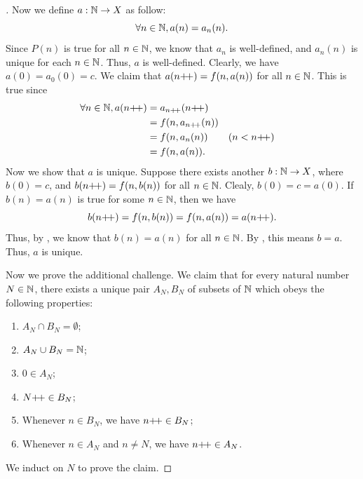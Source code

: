 \begin{proof}[]
  Now we define \(a : \mathbb{N} \to X\) as follow:
  \[
    \forall n \in \mathbb{N}, a(n) = a_n(n).
  \]
  Since \(P(n)\) is true for all \(n \in \mathbb{N}\), we know that \(a_n\) is well-defined, and \(a_n(n)\) is unique for each \(n \in \mathbb{N}\).
  Thus, \(a\) is well-defined.
  Clearly, we have \(a(0) = a_0(0) = c\).
  We claim that \(a(n{+}\!{+}) = f(n, a(n))\) for all \(n \in \mathbb{N}\).
  This is true since
  \begin{align*}
    \forall n \in \mathbb{N}, a(n{+}\!{+}) & = a_{n{+}\!{+}}(n{+}\!{+})                    \\
                              & = f(n, a_{n{+}\!{+}}(n))                 \\
                              & = f(n, a_n(n))      &  & (n < n{+}\!{+}) \\
                              & = f(n, a(n)).
  \end{align*}
  Now we show that \(a\) is unique.
  Suppose there exists another \(b : \mathbb{N} \to X\), where \(b(0) = c\), and \(b(n{+}\!{+}) = f(n, b(n))\) for all \(n \in \mathbb{N}\).
  Clealy, \(b(0) = c = a(0)\).
  If \(b(n) = a(n)\) is true for some \(n \in \mathbb{N}\), then we have
  \[
    b(n{+}\!{+}) = f(n, b(n)) = f(n, a(n)) = a(n{+}\!{+}).
  \]
  Thus, by , we know that \(b(n) = a(n)\) for all \(n \in \mathbb{N}\).
  By , this means \(b = a\).
  Thus, \(a\) is unique.

  Now we prove the additional challenge.
  We claim that for every natural number \(N \in \mathbb{N}\), there exists a unique pair \(A_N, B_N\) of subsets of \(\mathbb{N}\) which obeys the following properties:
  \begin{enumerate}
    \item \(A_N \cap B_N = \emptyset\);
    \item \(A_N \cup B_N = \mathbb{N}\);
    \item \(0 \in A_N\);
    \item \(N{+}\!{+} \in B_N\);
    \item Whenever \(n \in B_N\), we have \(n{+}\!{+} \in B_N\);
    \item Whenever \(n \in A_N\) and \(n \neq N\), we have \(n{+}\!{+} \in A_N\).
  \end{enumerate}
  We induct on \(N\) to prove the claim.


\end{proof}
